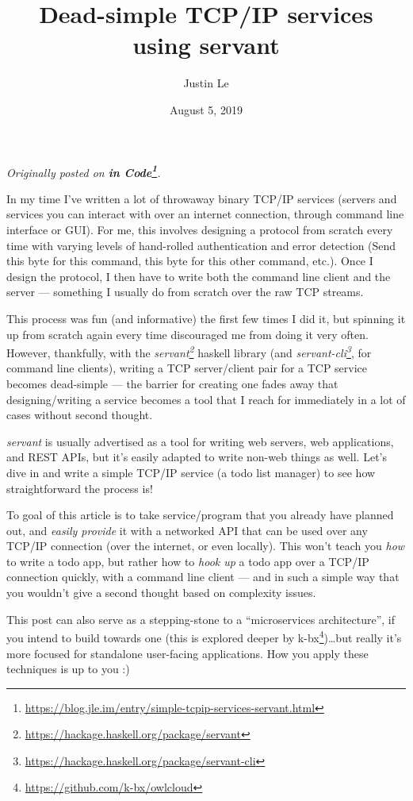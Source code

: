 \documentclass[]{article}
\title{Dead-simple TCP/IP services using servant}
\author{Justin Le}
\date{August 5, 2019}
\renewcommand{\href}[2]{#2\footnote{\url{#1}}}
\begin{document}
\maketitle

\emph{Originally posted on
\textbf{\href{https://blog.jle.im/entry/simple-tcpip-services-servant.html}{in
Code}}.}

In my time I've written a lot of throwaway binary TCP/IP services (servers and
services you can interact with over an internet connection, through command line
interface or GUI). For me, this involves designing a protocol from scratch every
time with varying levels of hand-rolled authentication and error detection (Send
this byte for this command, this byte for this other command, etc.). Once I
design the protocol, I then have to write both the command line client and the
server --- something I usually do from scratch over the raw TCP streams.

This process was fun (and informative) the first few times I did it, but
spinning it up from scratch again every time discouraged me from doing it very
often. However, thankfully, with the
\emph{\href{https://hackage.haskell.org/package/servant}{servant}} haskell
library (and
\emph{\href{https://hackage.haskell.org/package/servant-cli}{servant-cli}}, for
command line clients), writing a TCP server/client pair for a TCP service
becomes dead-simple --- the barrier for creating one fades away that
designing/writing a service becomes a tool that I reach for immediately in a lot
of cases without second thought.

\emph{servant} is usually advertised as a tool for writing web servers, web
applications, and REST APIs, but it's easily adapted to write non-web things as
well. Let's dive in and write a simple TCP/IP service (a todo list manager) to
see how straightforward the process is!

To goal of this article is to take service/program that you already have planned
out, and \emph{easily provide} it with a networked API that can be used over any
TCP/IP connection (over the internet, or even locally). This won't teach you
\emph{how} to write a todo app, but rather how to \emph{hook up} a todo app over
a TCP/IP connection quickly, with a command line client --- and in such a simple
way that you wouldn't give a second thought based on complexity issues.

This post can also serve as a stepping-stone to a ``microservices
architecture'', if you intend to build towards one (this is explored deeper by
\href{https://github.com/k-bx/owlcloud}{k-bx})\ldots but really it's more
focused for standalone user-facing applications. How you apply these techniques
is up to you :)
\end{document}
